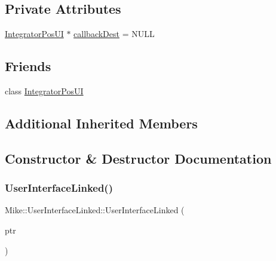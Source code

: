\subsection*{Private Attributes}
\begin{DoxyCompactItemize}
\item 
\hyperlink{class_mike_1_1_user_interface_linked_aa68f3dbce9d9f381bea2f56fda8bfb6b}{Integrator\+Pos\+UI} $\ast$ \hyperlink{class_mike_1_1_user_interface_linked_aced836eb94453776afa2d07387293ea7}{callback\+Dest} = N\+U\+LL
\end{DoxyCompactItemize}
\subsection*{Friends}
\begin{DoxyCompactItemize}
\item 
class \hyperlink{class_mike_1_1_user_interface_linked_aa68f3dbce9d9f381bea2f56fda8bfb6b}{Integrator\+Pos\+UI}
\end{DoxyCompactItemize}
\subsection*{Additional Inherited Members}


\subsection{Constructor \& Destructor Documentation}
\mbox{\label{class_mike_1_1_user_interface_linked_aa740cbba693f1b5bb18e9415fb986a05}} 
\subsubsection{\texorpdfstring{User\+Interface\+Linked()}{UserInterfaceLinked()}\hspace{0.1cm}{\footnotesize\ttfamily [1/2]}}
{\footnotesize\ttfamily Mike\+::\+User\+Interface\+Linked\+::\+User\+Interface\+Linked (\begin{DoxyParamCaption}\item[{\hyperlink{class_mike_1_1_user_interface_linked_aa68f3dbce9d9f381bea2f56fda8bfb6b}{Integrator\+Pos\+UI} $\ast$}]{ptr }\end{DoxyParamCaption})}

